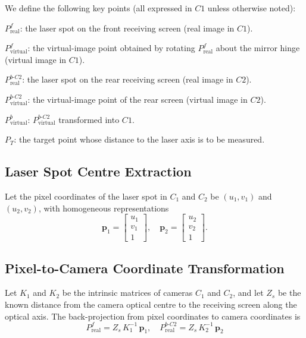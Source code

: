 We define the following key points (all expressed in $C1$
unless otherwise noted):

$P^f_{\mathrm{real}}$:
the laser spot on the front receiving screen
(real image in $C1$).

$P^f_{\mathrm{virtual}}$:
the virtual-image point obtained by rotating
$P^f_{\mathrm{real}}$ about the mirror hinge
(virtual image in $C1$).

$P^{b\text{-}C2}_{\mathrm{real}}$:
the laser spot on the rear receiving screen
(real image in $C2$).

$P^{b\text{-}C2}_{\mathrm{virtual}}$:
the virtual-image point of the rear screen
(virtual image in $C2$).

$P^b_{\mathrm{virtual}}$:
$P^{b\text{-}C2}_{\mathrm{virtual}}$ transformed
into $C1$.

$P_T$:
the target point whose distance to the laser axis
is to be measured.


\subsection{Laser Spot Centre Extraction}
\label{sec:extraction}

Let the pixel coordinates of the laser spot in
$C_1$ and $C_2$ be $(u_1, v_1)$ and $(u_2, v_2)$,
with homogeneous representations
%
\begin{equation}
  \mathbf{p}_1 =
  \begin{bmatrix} u_1 \\ v_1 \\ 1 \end{bmatrix}, \quad
  \mathbf{p}_2 =
  \begin{bmatrix} u_2 \\ v_2 \\ 1 \end{bmatrix}.
  \label{eq:pixel-coords}
\end{equation}



\subsection{Pixel-to-Camera Coordinate Transformation}
\label{sec:pixel2cam}

Let $K_1$ and $K_2$ be the intrinsic matrices of cameras
$C_1$ and $C_2$, and let $Z_s$ be the known distance from
the camera optical centre to the receiving screen along the
optical axis.
%
The back-projection from pixel coordinates to camera
coordinates is
%
\begin{equation}
  \boxed{
    P^f_{\mathrm{real}} = Z_s \, K_1^{-1}\, \mathbf{p}_1, \quad
    P^{b\text{-}C2}_{\mathrm{real}}
      = Z_s \, K_2^{-1}\, \mathbf{p}_2
  }
  \label{eq:backproj}
\end{equation}

